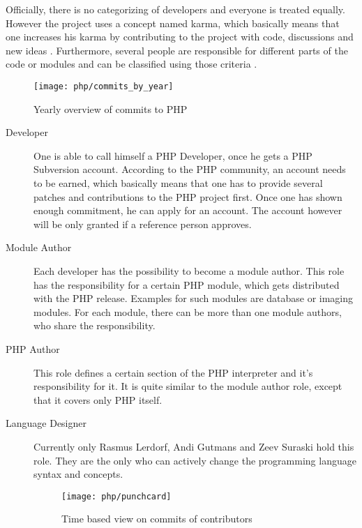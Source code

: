 Officially, there is no categorizing of developers and everyone is treated
equally. However the project uses a concept named karma, which basically means
that one increases his karma by contributing to the project with code,
discussions and new ideas \cite{Magnusson2010}. Furthermore, several people are
responsible for different parts of the code or modules and can be classified
using those criteria \cite{PHPCredits}.

\begin{figure}[htbp]
  \centering
  \texttt{[image: php/commits\_by\_year]}
  \caption{Yearly overview of commits to PHP}
\end{figure}

\begin{description}

  \item[Developer] One is able to call himself a PHP Developer, once he gets a
    PHP Subversion account. According to the PHP community, an account needs to
    be earned, which basically means that one has to provide several patches
    and contributions to the PHP project first. Once one has shown enough
    commitment, he can apply for an account. The account however will be only
    granted if a reference person approves.

  \item[Module Author] Each developer has the possibility to become a module
    author. This role has the responsibility for a certain PHP module, which
    gets distributed with the PHP release. Examples for such modules are
    database or imaging modules. For each module, there can be more than one
    module authors, who share the responsibility.

  \item[PHP Author] This role defines a certain section of the PHP interpreter
    and it's responsibility for it. It is quite similar to the module author
    role, except that it covers only PHP itself.

  \item[Language Designer] Currently only Rasmus Lerdorf, Andi Gutmans and Zeev
    Suraski hold this role. They are the only who can actively change the
    programming language syntax and concepts.

\begin{figure}[hbtp]
  \centering
  \texttt{[image: php/punchcard]}
  \caption{Time based view on commits of contributors}
\end{figure}

\end{description}


